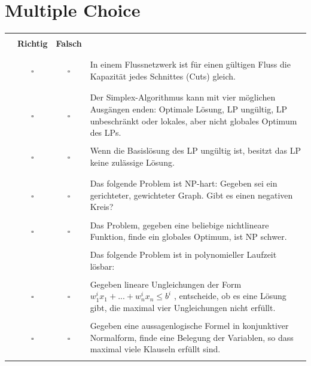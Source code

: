 \documentclass{article}
\begin{document}
\section{Multiple Choice}
\begin{longtable}[H]
    \centering
    \begin{tabular}{ | p{1cm} | c c | p{13cm} |} \hline
    & & & \\
     & \textbf{Richtig} & \textbf{Falsch} &  \\ & & & \\ \hline \hline  & & & \\
     \cite{probeklausur21}\cite{hauptklausur21}\cite{probeklausur24} & $\square$ &  $\square$  &  In einem Flussnetzwerk ist für einen gültigen Fluss die Kapazität jedes Schnittes (Cuts) gleich.\\ & & & \\  \hline \hline & & & \\
     \cite{probeklausur21}\cite{probeklausur24} & $\square$ &  $\square$  & Der Simplex-Algorithmus kann mit vier möglichen Ausgängen enden: Optimale Lösung, LP ungültig, LP unbeschränkt oder lokales, aber nicht globales Optimum des LPs. \\ & & & \\
     \cite{nachklausur19} & $\square$ &  $\square$   & Wenn die Basislösung des LP ungültig ist, besitzt das LP keine zulässige Lösung. \\ & & & \\ \hline \hline & & & \\
     \cite{probeklausur21}\cite{probeklausur24} & $\square$ &  $\square$  & Das folgende Problem ist NP-hart: Gegeben sei ein gerichteter, gewichteter Graph. Gibt es einen negativen Kreis? \\ & & & \\
     \cite{nachklausur19} & $\square$ &  $\square$  & Das Problem, gegeben eine beliebige nichtlineare Funktion, finde ein globales Optimum, ist NP schwer.\\ & & & \\
     & & & Das folgende Problem ist in polynomieller Laufzeit lösbar:\\ & & & \\
     \cite{nachklausur19} & $\square$ &  $\square$  &  Gegeben lineare Ungleichungen der Form $w_1^ix_1+...+w_n^i x_n \leq b^i$ , entscheide, ob es eine Lösung gibt, die maximal vier Ungleichungen nicht erfüllt. \\ & & & \\
     \cite{nachklausur19}& $\square$ &  $\square$  & Gegeben eine aussagenlogische Formel in konjunktiver Normalform, finde eine Belegung der Variablen, so dass maximal viele Klauseln erfüllt sind.  \\& & & \\

\end{tabular}
\end{longtable}
\end{document}
